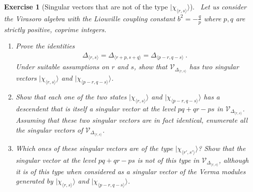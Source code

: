\documentclass[12pt, a4paper, notitlepage, twoside]{report}
\numberwithin{equation}{section}
\theoremstyle{break}
\newtheorem{exo}{Exercise}[chapter]
\begin{document}
\begin{exo}[Singular vectors that are not of the type $|\chi_{\langle r,s \rangle}\rangle$]
 ~\label{exosv}
Let us consider the Virasoro algebra with the Liouville coupling constant $b^2=-\frac{q}{p}$ where $p,q$ are strictly positive, coprime integers.
\begin{enumerate}
 \item 
Prove the identities 
\begin{align}
 \Delta_{\langle r,s \rangle}=\Delta_{\langle r+p,s+q \rangle}=\Delta_{\langle p-r,q-s \rangle}\ .
\end{align}
Under suitable assumptions on $r$ and $s$, show that $\mathcal{V}_{\Delta_{\langle r,s \rangle}}$ has two singular vectors $|\chi_{\langle r,s \rangle}\rangle$ and $|\chi_{\langle p-r,q-s \rangle}\rangle$.
\item
Show that each one of the two states  $|\chi_{\langle r,s \rangle}\rangle$ and $|\chi_{\langle p-r,q-s \rangle}\rangle$ has a descendent that is itself a singular vector at the level $pq+qr-ps$ in $\mathcal{V}_{\Delta_{\langle r,s \rangle}}$.
Assuming that these two singular vectors are in fact identical, enumerate all the singular vectors of $\mathcal{V}_{\Delta_{\langle r,s \rangle}}$.
\item
Which ones of these singular vectors are of the type $|\chi_{\langle r',s' \rangle}\rangle$? Show that the singular vector at the level $pq+qr-ps$ is not of this type in $\mathcal{V}_{\Delta_{\langle r,s \rangle}}$, although it is of this type when considered as a singular vector of the Verma modules generated by $|\chi_{\langle r,s \rangle}\rangle$ and $|\chi_{\langle p-r,q-s \rangle}\rangle$.
\end{enumerate}
\end{exo}
\end{document}
